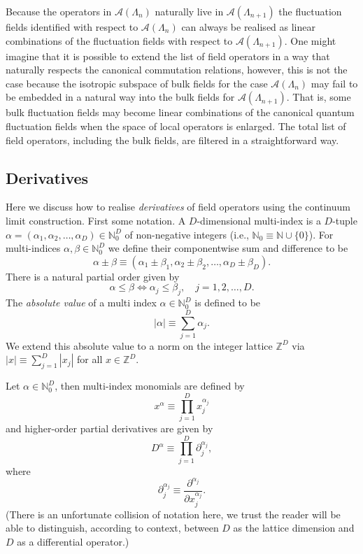 \documentclass[prl,twocolumn,lengthcheck,superscriptaddress]{revtex4-1}
\theoremstyle{definition}
\theoremstyle{remark}
\begin{document}
Because the operators in $\mathcal{A}(\Lambda_n)$ naturally live in $\mathcal{A}(\Lambda_{n+1})$ the fluctuation fields identified with respect to $\mathcal{A}(\Lambda_n)$ can always be realised as linear combinations of the fluctuation fields with respect to $\mathcal{A}(\Lambda_{n+1})$. One might imagine that it is possible to extend the list of field operators in a way that naturally respects the canonical commutation relations, however, this is not the case because the isotropic subspace of bulk fields for the case $\mathcal{A}(\Lambda_n)$ may fail to be embedded in a natural way into the bulk fields for $\mathcal{A}(\Lambda_{n+1})$. That is, some bulk fluctuation fields may become linear combinations of the canonical quantum fluctuation fields when the space of local operators is enlarged. The total list of field operators, including the bulk fields, are filtered in a straightforward way. 

\subsection{Derivatives} 
Here we discuss how to realise \emph{derivatives} of field operators using the continuum limit construction. First some notation.
A $D$-dimensional multi-index is a $D$-tuple $\alpha = (\alpha_1, \alpha_2, \ldots, \alpha_D) \in \mathbb{N}_0^D$ of non-negative integers (i.e., $\mathbb{N}_0 \equiv \mathbb{N}\cup \{0\}$).
For multi-indices  $\alpha, \beta \in \mathbb{N}_0^D$ we define their componentwise sum and difference to be 
\begin{equation}
	\alpha\pm\beta \equiv (\alpha_1\pm \beta_1, \alpha_2\pm \beta_2, \ldots, \alpha_D\pm \beta_D).
\end{equation}
There is a natural partial order given by
\begin{equation}
	\alpha\le \beta \Leftrightarrow \alpha_j\le \beta_j, \quad j = 1,2, \ldots, D.
\end{equation}
The \emph{absolute value} of a multi index $\alpha\in \mathbb{N}_0^D$ is defined to be
\begin{equation}
	|\alpha| \equiv \sum_{j=1}^D \alpha_j.
\end{equation}
We extend this absolute value to a norm on the integer lattice $\mathbb{Z}^D$ via $|x| \equiv \sum_{j=1}^D |x_j|$ for all $x\in\mathbb{Z}^D$.

Let $\alpha\in \mathbb{N}_0^D$, then multi-index monomials are defined by
\begin{equation}
	x^\alpha \equiv \prod_{j=1}^{D} x_j^{\alpha_j}
\end{equation}
and higher-order partial derivatives are given by
\begin{equation}
	D^{\alpha} \equiv \prod_{j=1}^D \partial_j^{\alpha_j},
\end{equation}
where
\begin{equation}
	\partial_j^{\alpha_j} \equiv \frac{\partial^{\alpha_j}}{\partial x_j^{\alpha_j}}.
\end{equation}
(There is an unfortunate collision of notation here, we trust the reader will be able to distinguish, according to context, between $D$ as the lattice dimension and $D$ as a differential operator.)
\end{document}
